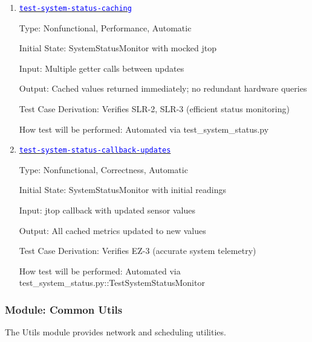 \documentclass[12pt, titlepage]{article}
\newcommand{\tid}[1]{\hyperlink{tid:#1}{\textcolor{blue}{\texttt{#1}}}}
\begin{document}
\begin{enumerate}

  \item{\tid{test-system-status-caching}\\}

        Type: Nonfunctional, Performance, Automatic

        Initial State: SystemStatusMonitor with mocked jtop

        Input: Multiple getter calls between updates

        Output: Cached values returned immediately; no redundant hardware queries

        Test Case Derivation: Verifies SLR-2, SLR-3 (efficient status monitoring)

        How test will be performed: Automated via test\_system\_status.py

  \item{\tid{test-system-status-callback-updates}\\}

        Type: Nonfunctional, Correctness, Automatic

        Initial State: SystemStatusMonitor with initial readings

        Input: jtop callback with updated sensor values

        Output: All cached metrics updated to new values

        Test Case Derivation: Verifies EZ-3 (accurate system telemetry)

        How test will be performed: Automated via
        test\_system\_status.py::TestSystemStatusMonitor

\end{enumerate}

\subsubsection{Module: Common Utils}

The Utils module provides network and scheduling utilities.
\end{document}
